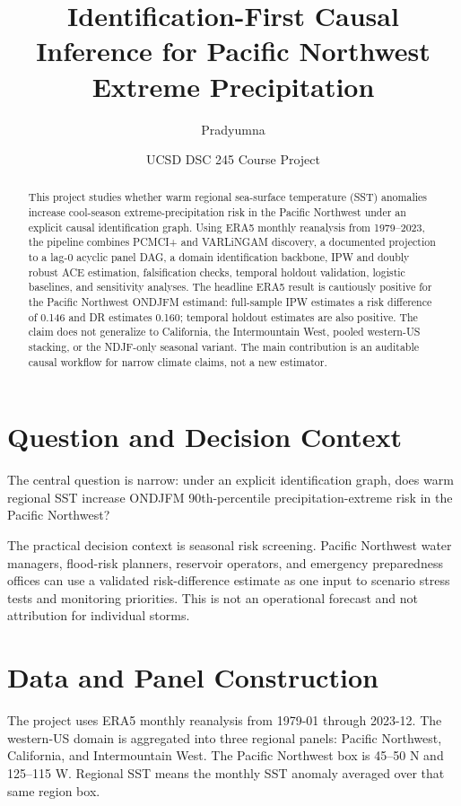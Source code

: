 \documentclass[11pt]{article}
\title{Identification-First Causal Inference for Pacific Northwest Extreme Precipitation}
\author{Pradyumna}
\date{UCSD DSC 245 Course Project}
\begin{document}
\maketitle

\begin{abstract}
This project studies whether warm regional sea-surface temperature (SST)
anomalies increase cool-season extreme-precipitation risk in the Pacific
Northwest under an explicit causal identification graph. Using ERA5 monthly
reanalysis from 1979--2023, the pipeline combines PCMCI+ and VARLiNGAM
discovery, a documented projection to a lag-0 acyclic panel DAG, a domain
identification backbone, IPW and doubly robust ACE estimation, falsification
checks, temporal holdout validation, logistic baselines, and sensitivity
analyses. The headline ERA5 result is cautiously positive for the Pacific
Northwest ONDJFM estimand: full-sample IPW estimates a risk difference of 0.146
and DR estimates 0.160; temporal holdout estimates are also positive. The claim
does not generalize to California, the Intermountain West, pooled western-US
stacking, or the NDJF-only seasonal variant. The main contribution is an
auditable causal workflow for narrow climate claims, not a new estimator.
\end{abstract}

\section{Question and Decision Context}

The central question is narrow: under an explicit identification graph, does
warm regional SST increase ONDJFM 90th-percentile precipitation-extreme risk in
the Pacific Northwest?

The practical decision context is seasonal risk screening. Pacific Northwest
water managers, flood-risk planners, reservoir operators, and emergency
preparedness offices can use a validated risk-difference estimate as one input
to scenario stress tests and monitoring priorities. This is not an operational
forecast and not attribution for individual storms.

\section{Data and Panel Construction}

The project uses ERA5 monthly reanalysis \citep{hersbach2020era5} from
1979-01 through 2023-12. The western-US domain is aggregated into three regional
panels: Pacific Northwest, California, and Intermountain West. The Pacific
Northwest box is 45--50 N and 125--115 W. Regional SST means the monthly SST
anomaly averaged over that same region box.
\end{document}
